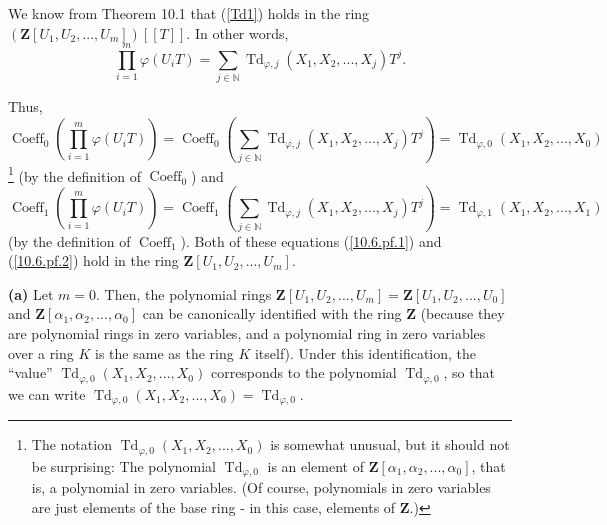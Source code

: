 \documentclass[numbers=enddot,12pt,final,onecolumn,notitlepage]{scrartcl}%
\begin{document}
We know from Theorem 10.1 that (\ref{Td1}) holds in the ring $\left(
\mathbf{Z}\left[  U_{1},U_{2},...,U_{m}\right]  \right)  \left[  \left[
T\right]  \right]  $. In other words,%
\[
\prod\limits_{i=1}^{m}\varphi\left(  U_{i}T\right)  =\sum_{j\in\mathbb{N}%
}\operatorname*{Td}\nolimits_{\varphi,j}\left(  X_{1},X_{2},...,X_{j}\right)
T^{j}.
\]


Thus,
\begin{equation}
\operatorname*{Coeff}\nolimits_{0}\left(  \prod\limits_{i=1}^{m}\varphi\left(
U_{i}T\right)  \right)  =\operatorname*{Coeff}\nolimits_{0}\left(
\sum\limits_{j\in\mathbb{N}}\operatorname*{Td}\nolimits_{\varphi,j}\left(
X_{1},X_{2},...,X_{j}\right)  T^{j}\right)  =\operatorname*{Td}%
\nolimits_{\varphi,0}\left(  X_{1},X_{2},...,X_{0}\right)  \label{10.6.pf.1}%
\end{equation}
\footnote{The notation $\operatorname*{Td}\nolimits_{\varphi,0}\left(
X_{1},X_{2},...,X_{0}\right)  $ is somewhat unusual, but it should not be
surprising: The polynomial $\operatorname*{Td}\nolimits_{\varphi,0}$ is an
element of $\mathbf{Z}\left[  \alpha_{1},\alpha_{2},...,\alpha_{0}\right]  $,
that is, a polynomial in zero variables. (Of course, polynomials in zero
variables are just elements of the base ring - in this case, elements of
$\mathbf{Z}$.)} (by the definition of $\operatorname*{Coeff}\nolimits_{0}$)
and%
\begin{equation}
\operatorname*{Coeff}\nolimits_{1}\left(  \prod\limits_{i=1}^{m}\varphi\left(
U_{i}T\right)  \right)  =\operatorname*{Coeff}\nolimits_{1}\left(
\sum\limits_{j\in\mathbb{N}}\operatorname*{Td}\nolimits_{\varphi,j}\left(
X_{1},X_{2},...,X_{j}\right)  T^{j}\right)  =\operatorname*{Td}%
\nolimits_{\varphi,1}\left(  X_{1},X_{2},...,X_{1}\right)  \label{10.6.pf.2}%
\end{equation}
(by the definition of $\operatorname*{Coeff}\nolimits_{1}$). Both of these
equations (\ref{10.6.pf.1}) and (\ref{10.6.pf.2}) hold in the ring
$\mathbf{Z}\left[  U_{1},U_{2},...,U_{m}\right]  $.

\textbf{(a)} Let $m=0$. Then, the polynomial rings $\mathbf{Z}\left[
U_{1},U_{2},...,U_{m}\right]  =\mathbf{Z}\left[  U_{1},U_{2},...,U_{0}\right]
$ and $\mathbf{Z}\left[  \alpha_{1},\alpha_{2},...,\alpha_{0}\right]  $ can be
canonically identified with the ring $\mathbf{Z}$ (because they are polynomial
rings in zero variables, and a polynomial ring in zero variables over a ring
$K$ is the same as the ring $K$ itself). Under this identification, the
``value'' $\operatorname*{Td}\nolimits_{\varphi,0}\left(  X_{1},X_{2}%
,...,X_{0}\right)  $ corresponds to the polynomial $\operatorname*{Td}%
\nolimits_{\varphi,0}$, so that we can write $\operatorname*{Td}%
\nolimits_{\varphi,0}\left(  X_{1},X_{2},...,X_{0}\right)  =\operatorname*{Td}%
\nolimits_{\varphi,0}$.
\end{document}
